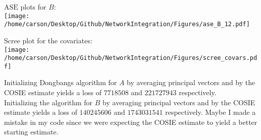 \documentclass[notheorems]{beamer}
\theoremstyle{definition}
\begin{document}
\begin{frame}
$\text{ASE}$ plots for $B$:\\
\texttt{[image: /home/carson/Desktop/Github/NetworkIntegration/Figures/ase\_B\_12.pdf]}
\end{frame}





















\begin{frame}
Scree plot for the covariates:\\
\texttt{[image: /home/carson/Desktop/Github/NetworkIntegration/Figures/scree\_covars.pdf]}
\end{frame}

















\begin{frame}
Initializing Dongbangs algorithm for $A$ by averaging principal vectors and by the COSIE estimate yields a loss of  $7718508$ and $221727943$ respectively.\\

Initializing the algorithm for $B$ by averaging principal vectors and by the COSIE estimate yields a loss of  $140245606$ and $1743031541$ respectively. Maybe I made a mistake in my code since we were expecting the COSIE estimate to yield a better starting estimate. 
\end{frame}

















\begin{frame}

\end{frame}

















\begin{frame}

\end{frame}
\end{document}
